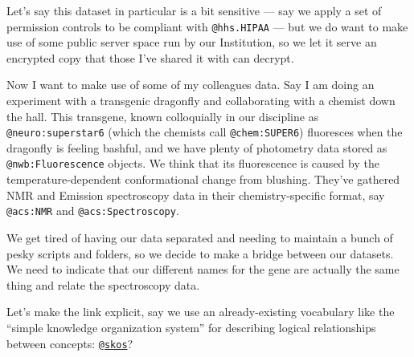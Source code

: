 Let's say this dataset in particular is a bit sensitive --- say we apply
a set of permission controls to be compliant with \texttt{@hhs.HIPAA}
--- but we do want to make use of some public server space run by our
Institution, so we let it serve an encrypted copy that those I've shared
it with can decrypt.

\begin{Shaded}
\begin{Highlighting}[]

  
\end{Highlighting}
\end{Shaded}

Now I want to make use of some of my colleagues data. Say I am doing an
experiment with a transgenic dragonfly and collaborating with a chemist
down the hall. This transgene, known colloquially in our discipline as
\texttt{@neuro:superstar6} (which the chemists call
\texttt{@chem:SUPER6}) fluoresces when the dragonfly is feeling bashful,
and we have plenty of photometry data stored as
\texttt{@nwb:Fluorescence} objects. We think that its fluorescence is
caused by the temperature-dependent conformational change from blushing.
They've gathered NMR and Emission spectroscopy data in their
chemistry-specific format, say \texttt{@acs:NMR} and
\texttt{@acs:Spectroscopy}.

We get tired of having our data separated and needing to maintain a
bunch of pesky scripts and folders, so we decide to make a bridge
between our datasets. We need to indicate that our different names for
the gene are actually the same thing and relate the spectroscopy data.

Let's make the link explicit, say we use an already-existing vocabulary
like the ``simple knowledge organization system'' for describing logical
relationships between concepts:
\href{https://www.w3.org/2009/08/skos-reference/skos.html}{\texttt{@skos}}?

\begin{Shaded}
\begin{Highlighting}[]
\end{Highlighting}
\end{Shaded}


